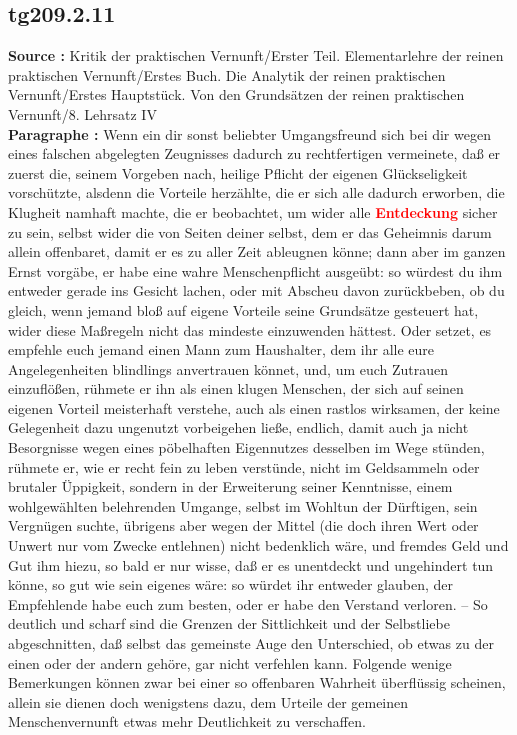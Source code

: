 \documentclass[a4paper,12pt,twoside]{book}
\newcommand{\match}[1]{\textcolor{red}{\textbf{#1}}}
\begin{document}
	\subsection*{tg209.2.11} 
	\textbf{Source : }Kritik der praktischen Vernunft/Erster Teil. Elementarlehre der reinen praktischen Vernunft/Erstes Buch. Die Analytik der reinen praktischen Vernunft/Erstes Hauptstück. Von den Grundsätzen der reinen praktischen Vernunft/8. Lehrsatz IV\\  
	
	\textbf{Paragraphe : }Wenn ein dir sonst beliebter Umgangsfreund sich bei dir wegen eines falschen abgelegten Zeugnisses dadurch zu rechtfertigen vermeinete, daß er zuerst die, seinem Vorgeben nach, heilige Pflicht der eigenen Glückseligkeit vorschützte, alsdenn die Vorteile herzählte, die er sich alle dadurch erworben, die Klugheit namhaft machte, die er beobachtet, um wider alle \match{Entdeckung} sicher zu sein, selbst wider die von Seiten deiner selbst, dem er das Geheimnis darum allein offenbaret, damit er es zu aller Zeit ableugnen könne; dann aber im ganzen Ernst vorgäbe, er habe eine wahre Menschenpflicht ausgeübt: so würdest du ihm entweder gerade ins Gesicht lachen, oder mit Abscheu davon zurückbeben, ob du gleich, wenn jemand bloß auf eigene Vorteile seine Grundsätze gesteuert hat, wider diese Maßregeln nicht das mindeste einzuwenden hättest. Oder setzet, es empfehle euch jemand einen Mann zum Haushalter, dem ihr alle eure Angelegenheiten blindlings anvertrauen könnet, und, um euch Zutrauen einzuflößen, rühmete er ihn als einen klugen Menschen, der sich auf seinen eigenen Vorteil meisterhaft verstehe, auch als einen rastlos wirksamen, der keine Gelegenheit dazu ungenutzt vorbeigehen ließe, endlich, damit auch ja nicht Besorgnisse wegen eines pöbelhaften Eigennutzes desselben im Wege stünden, rühmete er, wie er recht fein zu leben verstünde, nicht im Geldsammeln oder brutaler Üppigkeit, sondern in der Erweiterung seiner Kenntnisse, einem wohlgewählten belehrenden Umgange, selbst im Wohltun der Dürftigen, sein Vergnügen suchte, übrigens aber wegen der Mittel (die doch ihren Wert oder Unwert nur vom Zwecke entlehnen) nicht bedenklich wäre, und fremdes Geld und Gut ihm hiezu, so bald er nur wisse,  daß er es unentdeckt und ungehindert tun könne, so gut wie sein eigenes wäre: so würdet ihr entweder glauben, der Empfehlende habe euch zum besten, oder er habe den Verstand verloren. – So deutlich und scharf sind die Grenzen der Sittlichkeit und der Selbstliebe abgeschnitten, daß selbst das gemeinste Auge den Unterschied, ob etwas zu der einen oder der andern gehöre, gar nicht verfehlen kann. Folgende wenige Bemerkungen können zwar bei einer so offenbaren Wahrheit überflüssig scheinen, allein sie dienen doch wenigstens dazu, dem Urteile der gemeinen Menschenvernunft etwas mehr Deutlichkeit zu verschaffen. 
	
\end{document}
